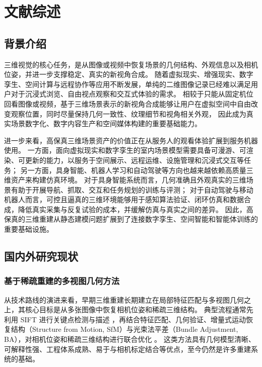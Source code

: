 \cleardoublepage
\newrefsection
\chapter{文献综述}

\section{背景介绍}

三维视觉的核心任务，是从图像或视频中恢复场景的几何结构、外观信息以及相机位姿，并进一步支撑稳定、真实的新视角合成。
随着虚拟现实、增强现实、数字孪生、空间计算与远程协作等应用不断发展，单纯的二维图像记录已经难以满足用户对于沉浸式浏览、自由视点观察和交互式体验的需求。
相较于只能从固定机位回看图像或视频，基于三维场景表示的新视角合成能够让用户在虚拟空间中自由改变观察位置，同时尽量保持几何一致性、纹理细节和视角相关外观，
因此成为真实场景数字化、数字内容生产和空间媒体构建的重要基础能力。

进一步来看，高保真三维场景资产的价值正在从服务人的观看体验扩展到服务机器使用。
一方面，面向虚拟现实和数字孪生的室内场景模型需要具备可漫游、可渲染、可更新的能力，以服务于空间展示、远程运维、设施管理和沉浸式交互等任务；
另一方面，具身智能、机器人学习和自动驾驶等方向也越来越依赖高质量三维资产来构建仿真环境。
对于具身智能系统而言，几何准确且外观真实的三维场景有助于开展导航、抓取、交互和任务规划的训练与评测；
对于自动驾驶与移动机器人而言，可控且逼真的三维环境能够用于感知算法验证、闭环仿真和数据合成，降低真实采集与反复试验的成本，并缓解仿真与真实之间的差异。
因此，高保真的三维重建从静态建模问题扩展到了连接数字孪生、空间智能和智能体训练的重要基础设施。

\section{国内外研究现状}

\subsection{基于稀疏重建的多视图几何方法}

从技术路线的演进来看，早期三维重建长期建立在局部特征匹配与多视图几何之上，其核心目标是从多张图像中恢复相机位姿和稀疏三维结构。
典型流程通常先利用 SIFT 进行关键点检测与描述 \cite{lowe2004sift}，再结合特征匹配、几何验证、增量式运动恢复结构（Structure from Motion, SfM）与光束法平差（Bundle Adjustment, BA），对相机位姿和稀疏三维结构进行联合优化 \cite{triggs1999bundle,schonberger2016sfm}。
这类方法具有几何模型清晰、可解释性强、工程体系成熟、易于与相机标定结合等优点，至今仍然是许多重建系统的基础。

